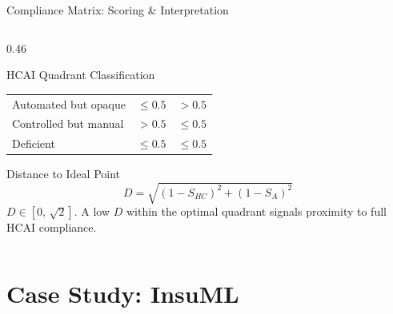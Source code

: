 \documentclass[aspectratio=169,10pt,english,dvipsnames]{beamer}
\begin{document}
\begin{frame}{Compliance Matrix: Scoring \& Interpretation}
\begin{columns}[T]
\begin{column}{0.46\textwidth}
\begin{block}{HCAI Quadrant Classification}
\begin{tabular}{p{3.0cm} l l}
          Automated but opaque & $\leq0.5$ & $>0.5$ \\
          Controlled but manual & $>0.5$ & $\leq0.5$ \\
          Deficient & $\leq0.5$ & $\leq0.5$ \\
          \bottomrule
        \end{tabular}
      \end{block}
      \vspace{3mm}
      \begin{block}{Distance to Ideal Point}\scriptsize
        \[
          D = \sqrt{(1-S_{HC})^2 + (1-S_{A})^2}
        \]
        $D \in [0,\,\sqrt{2}]$.
        A low $D$ within the optimal quadrant signals proximity
        to full HCAI compliance.
      \end{block}
    \end{column}
  \end{columns}
\end{frame}

\section{Case Study: InsuML}
\end{document}
